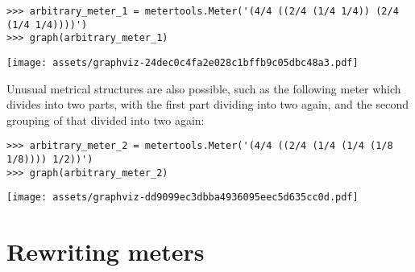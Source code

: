 \begin{comment}
<abjad>
arbitrary_meter_1 = metertools.Meter('(4/4 ((2/4 (1/4 1/4)) (2/4 (1/4 1/4))))')
graph(arbitrary_meter_1)
</abjad>
\end{comment}

\begin{abjadbookoutput}
\begin{singlespacing}
\vspace{-0.5\baselineskip}
\begin{verbatim}
>>> arbitrary_meter_1 = metertools.Meter('(4/4 ((2/4 (1/4 1/4)) (2/4 (1/4 1/4))))')
>>> graph(arbitrary_meter_1)
\end{verbatim}
\noindent\texttt{[image: assets/graphviz-24dec0c4fa2e028c1bffb9c05dbc48a3.pdf]}
\end{singlespacing}
\end{abjadbookoutput}

\noindent Unusual metrical structures are also possible, such as the following
 meter which divides into two parts, with the first part dividing
into two again, and the second grouping of that divided into two again:

\begin{comment}
<abjad>
arbitrary_meter_2 = metertools.Meter('(4/4 ((2/4 (1/4 (1/4 (1/8 1/8)))) 1/2))')
graph(arbitrary_meter_2)
</abjad>
\end{comment}

\begin{abjadbookoutput}
\begin{singlespacing}
\vspace{-0.5\baselineskip}
\begin{verbatim}
>>> arbitrary_meter_2 = metertools.Meter('(4/4 ((2/4 (1/4 (1/4 (1/8 1/8)))) 1/2))')
>>> graph(arbitrary_meter_2)
\end{verbatim}
\noindent\texttt{[image: assets/graphviz-dd9099ec3dbba4936095eec5d635cc0d.pdf]}
\end{singlespacing}
\end{abjadbookoutput}

\section{Rewriting meters}
\label{sec:rewriting-meters}


